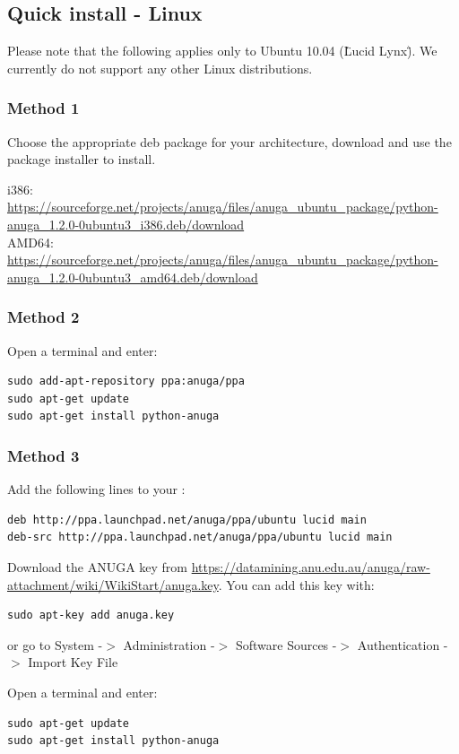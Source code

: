 \documentclass{manual}
\begin{document}
\subsection{Quick install - Linux}
\label{sec:linux}

Please note that the following applies only to Ubuntu 10.04 (\"Lucid Lynx\"). We currently do not
support any other Linux distributions.

\subsubsection{Method 1}

Choose the appropriate deb package for your architecture, download and use the package installer to install.

i386: \url{https://sourceforge.net/projects/anuga/files/anuga_ubuntu_package/python-anuga_1.2.0-0ubuntu3_i386.deb/download}\\
AMD64: \url{https://sourceforge.net/projects/anuga/files/anuga_ubuntu_package/python-anuga_1.2.0-0ubuntu3_amd64.deb/download}

\subsubsection{Method 2}

Open a terminal and enter:
\begin{verbatim}
sudo add-apt-repository ppa:anuga/ppa
sudo apt-get update
sudo apt-get install python-anuga
\end{verbatim}

\subsubsection{Method 3}

Add the following lines to your :
\begin{verbatim}
deb http://ppa.launchpad.net/anuga/ppa/ubuntu lucid main
deb-src http://ppa.launchpad.net/anuga/ppa/ubuntu lucid main
\end{verbatim}
Download the ANUGA key from \url{https://datamining.anu.edu.au/anuga/raw-attachment/wiki/WikiStart/anuga.key}. You can add this key with:
\begin{verbatim}
sudo apt-key add anuga.key
\end{verbatim}
or go to System -$>$ Administration -$>$ Software Sources -$>$ Authentication -$>$ Import Key File

Open a terminal and enter:
\begin{verbatim}
sudo apt-get update
sudo apt-get install python-anuga
\end{verbatim}
\end{document}
